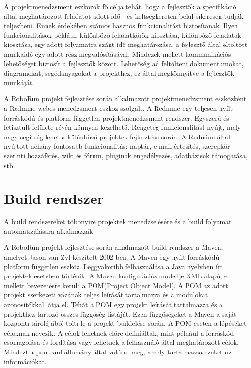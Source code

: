	A projektmenedzsment eszközök fő célja tehát, hogy a fejlesztők a specifikáció által meghatározott feladatot adott idő - és költségkereten belül sikeresen tudják teljesíteni. Ennek érdekében számos hasznos funkcionalitást biztosítanak. Ilyen funkcionalitások például, különböző feladatkörök kiosztása, különböző feladatok kiosztása, egy adott folyamatra szánt idő meghatározása, a fejlesztő által eltöltött munkaidő egy adott rész megvalósításával. Mindezek mellett kommunikációs lehetőséget biztosít a fejlesztők között. Lehetőség ad feltölteni dokumentumokat, diagramokat, segédanyagokat a projekthez, ez által megkönnyítve a fejlesztők munkáját. 
	
	A RoboRun projekt fejlesztése során alkalmazott projektmenedzsment eszközként a Redmine\citep{redmine} webes menedzsment eszköz szolgált. A Redmine egy teljesen  nyílt forráskódú és platform független projektmenedzsment rendszer. Egyszerű és letisztult felülete révén könnyen kezelhető. Rengeteg funkcionalítást nyújt, mely nagy segítség lehet a különböző projektek fejlesztése során. A  Redmine által nyújtott néhány fontosabb funkcionalitás: naptár, e-mail értesítés, szerepkör szerinti hozzáférés, wiki és fórum, pluginok engedélyezés, adatbázisok támogatása, stb.



\section{Build rendszer}

A build rendszereket többnyire projektek menedzselésére és a build folyamat automatizálására alkalmazzák. 

	A RoboRun projekt fejlesztése során alkalmazott build rendszer a Maven\cite{maven}, amelyet Jason van Zyl készített 2002-ben. A Maven egy nyílt forráskódú, platform független eszköz. Leggyakoribb felhasználása a Java nyelvben írt projektek esetében történik. A Maven konfigurációs modellje XML alapú, e mellett bevezetésre került a POM(Project Object Model). A POM az adott projekt szerkezeti vázának teljes leírását tartalmazza és a modulokat azonosítókkal látja el. Tehát a POM egy projekt leírását tartalmazza és a projekthez tartozó összes függőség listáját. Ezen függőségeket a Maven a saját központi tárolójából tölti le a projekt buildelése során. A POM esetén a lépéseket céloknak nevezik. A célok lehetnek előre definiáltak, mint például a forráskód csomagolása és fordítása vagy lehetnek a felhasználó által meghatározott célok.  Mindezt a pom.xml állomány által valósul meg, amely tartalmazza ezeket az információkat. 
	
